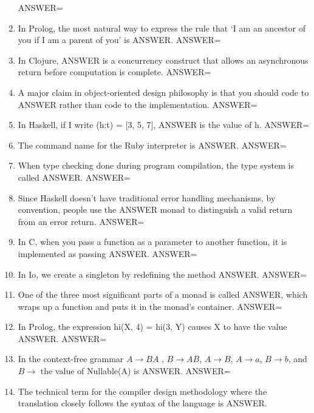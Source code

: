 \documentclass{exam}
\begin{document}
\begin{enumerate}
ANSWER=
\item In Prolog, the most natural way to express the rule that `I am an ancestor of you if I am a parent of you' is ANSWER.\newline
ANSWER=
\item In Clojure, ANSWER is a concurrency construct that allows an asynchronous return before computation is complete.\newline
ANSWER=
\item A major claim in object-oriented design philosophy is that you should code to ANSWER rather than code to the implementation.\newline
ANSWER=
\item In Haskell, if I write (h:t) = $\lbrack$3, 5, 7$\rbrack$, ANSWER is the value of h.\newline
ANSWER=
\item The command name for the Ruby interpreter is ANSWER.\newline
ANSWER=
\item When type checking done during program compilation, the type system is called ANSWER.\newline
ANSWER=
\item Since Haskell doesn't have traditional error handling mechanisms, by convention, people use the ANSWER monad to distinguish a valid return from an error return.\newline
ANSWER=
\item In C, when you pass a function as a parameter to another function, it is implemented as passing ANSWER.\newline
ANSWER=
\item In Io, we create a singleton by redefining the method ANSWER.\newline
ANSWER=
\item One of the three most significant parts of a monad is called ANSWER, which wraps up a function and puts it in the monad's container.\newline
ANSWER=
\item In Prolog, the expression hi(X, 4) = hi(3, Y) causes X to have the value ANSWER.\newline
ANSWER=
\item In the context-free grammar $A \rightarrow B A$ , $B \rightarrow A B$, $A \rightarrow B$, $A \rightarrow a$, $B \rightarrow b$, and $B \rightarrow$  the value of Nullable(A) is ANSWER.\newline
ANSWER=
\item The technical term for the compiler design methodology where the translation closely follows the syntax of the language is ANSWER.\newline

\end{enumerate}
\end{document}
